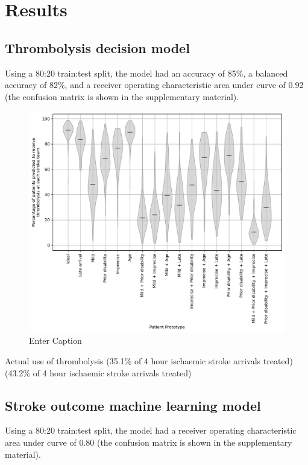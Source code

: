 \section{Results}


\subsection{Thrombolysis decision model}

Using a 80:20 train:test split, the model had an accuracy of 85\%, a balanced accuracy of 82\%, and a receiver operating characteristic area under curve of 0.92 (the confusion matrix is shown in the supplementary material).

\begin{figure}
    \centering
    \includegraphics[width=0.75\linewidth]{images/prototype_patients_all_teams}
    \caption{Enter Caption}
    \label{fig:thrombolysis_rates_prototype_patients}
\end{figure}

Actual use of thrombolysis (35.1\% of 4 hour ischaemic stroke arrivals treated)
(43.2\% of 4 hour ischaemic stroke arrivals treated)

\subsection{Stroke outcome machine learning model}

Using a 80:20 train:test split, the model had a receiver operating characteristic area under curve of 0.80 (the confusion matrix is shown in the supplementary material).

